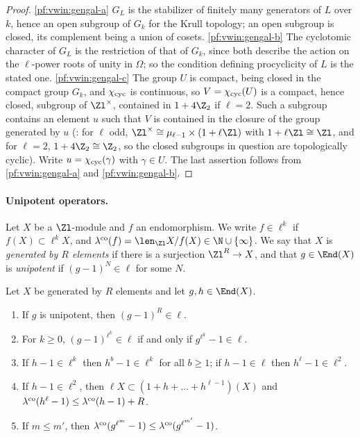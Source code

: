 \begin{proof}
\ref{pf:vwin:gengal-a} $G_L$ is the stabilizer of finitely many generators of $L$ over $k$, hence an open subgroup of $G_k$ for
the Krull topology; an open subgroup is closed, its complement being a union of cosets.
\ref{pf:vwin:gengal-b} The cyclotomic character of $G_L$ is the restriction of that of $G_k$, since both describe the action on the
$\ell$-power roots of unity in $\Omega$; so the condition defining procyclicity of $L$ is the stated one.
\ref{pf:vwin:gengal-c} The group $U$ is compact, being closed in the compact group $G_k$, and $\chi_{\mathrm{cyc}}$ is continuous, so
$V=\chi_{\mathrm{cyc}}(U)$ is a compact, hence closed, subgroup of $\Zl^\times$, contained in $1+4\Z_2$ if $\ell=2$. Such a subgroup contains
an element $u$ such that $V$ is contained in the closure of the group generated by $u$ (: for
$\ell$ odd, $\Zl^\times\cong\mu_{\ell-1}\times(1+\ell\Zl)$ with $1+\ell\Zl\cong\Zl$, and for $\ell=2$, $1+4\Z_2\cong\Z_2$, so the
closed subgroups in question are topologically cyclic). Write $u=\chi_{\mathrm{cyc}}(\gamma)$ with $\gamma\in U$. The last assertion follows
from \ref{pf:vwin:gengal-a} and \ref{pf:vwin:gengal-b}.
\end{proof}

\paragraph{Unipotent operators.} Let $X$ be a $\Zl$-module and $f$ an endomorphism. We write $f\in\ell^k$ if
$f(X)\subset\ell^kX$, and $\vwincok(f)=\len_{\Zl}X/f(X)\in\N\cup\{\infty\}$. We say that $X$ is \emph{generated by $R$
elements} if there is a surjection $\Zl^R\to X$, and that $g\in\End(X)$ is \emph{unipotent} if $(g-1)^N\in\ell$ for some $N$.

\begin{lemma}\label{pf:vwin:unip}
Let $X$ be generated by $R$ elements and let $g,h\in\End(X)$.
\begin{enumerate}[label=(\alph*)]
\item\label{pf:vwin:unip-a} If $g$ is unipotent, then $(g-1)^R\in\ell$.
\item\label{pf:vwin:unip-b} For $k\ge0$, $(g-1)^{\ell^k}\in\ell$ if and only if $g^{\ell^k}-1\in\ell$.
\item\label{pf:vwin:unip-c} If $h-1\in\ell^k$ then $h^b-1\in\ell^k$ for all $b\ge1$; if $h-1\in\ell$ then $h^\ell-1\in\ell^2$.
\item\label{pf:vwin:unip-d} If $h-1\in\ell^2$, then $\ell X\subset(1+h+\dots+h^{\ell-1})(X)$ and
$\lambda^{\mathrm{co}}(h^\ell-1)\le\lambda^{\mathrm{co}}(h-1)+R$.
\item\label{pf:vwin:unip-e} If $m\le m'$, then $\lambda^{\mathrm{co}}(g^{\ell^m}-1)\le\lambda^{\mathrm{co}}(g^{\ell^{m'}}-1)$.
\end{enumerate}
\end{lemma}

